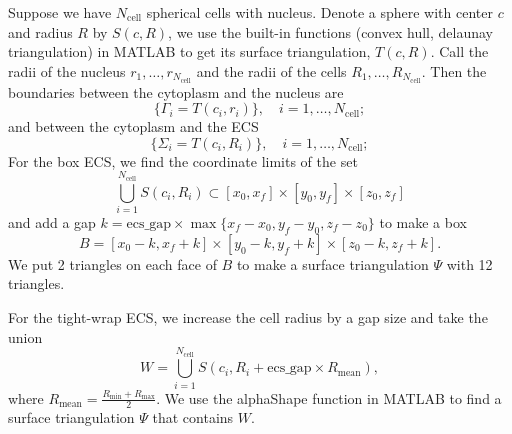 Suppose we have $N_\text{cell}$ spherical cells with nucleus. Denote a sphere with center $c$ and radius $R$ by $S(c, R)$, we use the built-in functions (convex hull, delaunay triangulation) in MATLAB to get its surface triangulation, $T(c, R)$. Call the radii of the nucleus $r_1, \dots, r_{N_\text{cell}}$ and the radii of the cells $R_1, \dots, R_{N_\text{cell}}$. Then the boundaries between the cytoplasm and the nucleus are
$$\{\Gamma_i = T(c_i, r_i)\}, \quad i = 1, \dots, N_\text{cell};$$
and between the cytoplasm and the ECS
$$\{\Sigma_i = T(c_i, R_i)\}, \quad i = 1, \dots, N_\text{cell};$$
For the box ECS, we find the coordinate limits of the set
$$\bigcup_{i=1}^{N_\text{cell}} S(c_i,R_i) \subset [x_0,x_f]\times [y_0,y_f] \times [z_0,z_f]$$
and add a gap $k = \text{ecs\_gap}\times \max\{x_f-x_0,y_f-y_0,z_f-z_0\}$ to make a box
$$B = [x_0 - k, x_f + k]\times [y_0 - k, y_f + k] \times [z_0 - k, z_f + k].$$
We put 2 triangles on each face of $B$ to make a surface triangulation $\Psi$ with 12 triangles.

For the tight-wrap ECS, we increase the cell radius by a gap size and take the union
$$W = \bigcup_{i=1}^{N_\text{cell}} S(c_i,R_i+\text{ecs\_gap}\times R_\text{mean}),$$
where $R_\text{mean}=\frac{R_\text{min}+R_\text{max}}{2}$. We use the alphaShape function in MATLAB to find a surface triangulation $\Psi$ that contains $W$.

